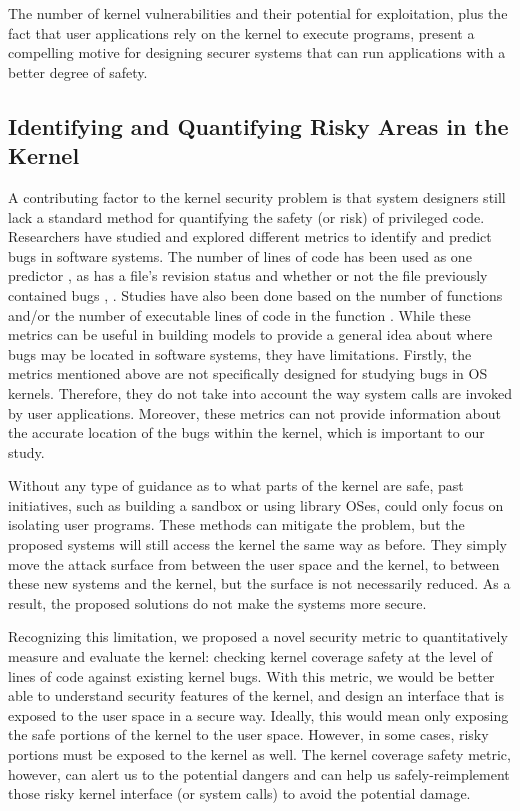 The number of kernel vulnerabilities and their potential for exploitation, 
plus the fact that user applications rely on the kernel to execute programs, 
present a compelling motive for designing securer systems that can run applications with a better degree of safety.

\subsection{Identifying and  Quantifying Risky Areas in the Kernel}

A contributing factor to the kernel security problem is that system designers 
still lack a standard method for quantifying the safety (or risk) of privileged code. 
Researchers have studied and explored different metrics to identify and predict bugs in software systems. 
The number of lines of code has been used as one predictor \cite{Bug-Location}, as has a file's revision status and 
whether or not the file previously contained bugs \cite{lewis2013does}, \cite{Bug-Location}. Studies have also been done based on 
the number of functions and/or the number of executable lines of code in the function \cite{Mining-Metrics}. 
While these metrics can be useful in building models to provide a general idea about 
where bugs may be located in software systems, they have limitations. 
Firstly, the metrics mentioned above are not specifically designed for studying bugs in OS kernels. 
Therefore, they do not take into account the way system calls are invoked by user applications. 
Moreover, these metrics can not provide information about the accurate location of the bugs within the kernel, 
which is important to our study.

Without any type of guidance as to what parts of the kernel are safe, past initiatives, 
such as building a sandbox or using library OSes, could only focus on isolating user programs. 
These methods can mitigate the problem, but the proposed systems will still access the kernel the same way as before. 
They simply move the attack surface from between the user space and the kernel, 
to between these new systems and the kernel, but the surface is not necessarily reduced. 
As a result, the proposed solutions do not make the systems more secure. 

Recognizing this limitation, we proposed a novel security metric to quantitatively measure and evaluate the kernel: 
checking kernel coverage safety at the level of lines of code against existing kernel bugs. 
With this metric, we would be better able to understand security features of the kernel, 
and design an interface that is exposed to the user space in a secure way. Ideally, 
this would mean only exposing the safe portions of the kernel to the user space. 
However, in some cases, risky portions must be exposed to the kernel as well. 
The kernel coverage safety metric, however, can alert us to the potential dangers and 
can help us safely-reimplement those risky kernel interface (or system calls) to avoid the potential damage.

